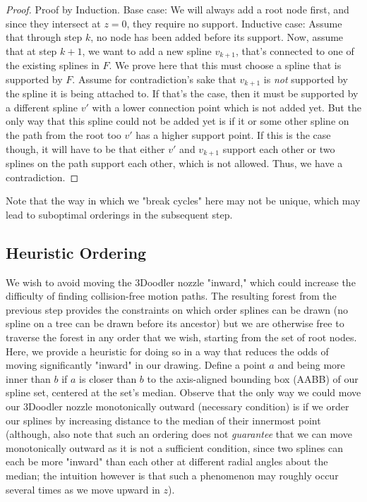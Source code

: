 \documentclass[conference]{acmsiggraph}
\begin{document}
\begin{proof}
Proof by Induction.
Base case: We will always add a root node first, and since they intersect at $z=0$, they require no support.
Inductive case: Assume that through step $k$, no node has been added before its support.  Now, assume that at step $k+1$, we want to add a new spline $v_{k+1}$, that's connected to one of the existing splines in $F$.  We prove here that this must choose a spline that is supported by $F$.  Assume for contradiction's sake that $v_{k+1}$ is \emph{not} supported by the spline it is being attached to.  If that's the case, then it must be supported by a different spline $v'$ with a lower connection point which is not added yet.  But the only way that this spline could not be added yet is if it or some other spline on the path from the root  too $v'$ has a higher support point.  If this is the case though, it will have to be that either $v'$ and $v_{k+1}$ support each other or two splines on the path support each other, which is not allowed.  Thus, we have a contradiction.



\end{proof}

Note that the way in which we "break cycles" here may not be unique, which may lead to suboptimal orderings in the subsequent step.


\subsection{Heuristic Ordering}
We wish to avoid moving the 3Doodler nozzle "inward," which could increase the difficulty of finding collision-free motion paths.  The resulting forest from the previous step provides the constraints on which order splines can be drawn (no spline on a tree can be drawn before its ancestor) but we are otherwise free to traverse the forest in any order that we wish, starting from the set of root nodes.  Here, we provide a heuristic for doing so in a way that reduces the odds of moving significantly "inward" in our drawing.  Define a point $a$ and being more inner than $b$ if $a$ is closer than $b$ to the axis-aligned bounding box (AABB) of our spline set, centered at the set's median.  Observe that the only way we could move our 3Doodler nozzle monotonically outward (necessary condition) is if we order our splines by increasing distance to the median of their innermost point (although, also note that such an ordering does not \emph{guarantee} that we can move monotonically outward as it is not a sufficient condition, since two splines can each be more "inward" than each other at different radial angles about the median; the intuition however is that such a phenomenon may roughly occur several times as we move upward in $z$).
\end{document}
